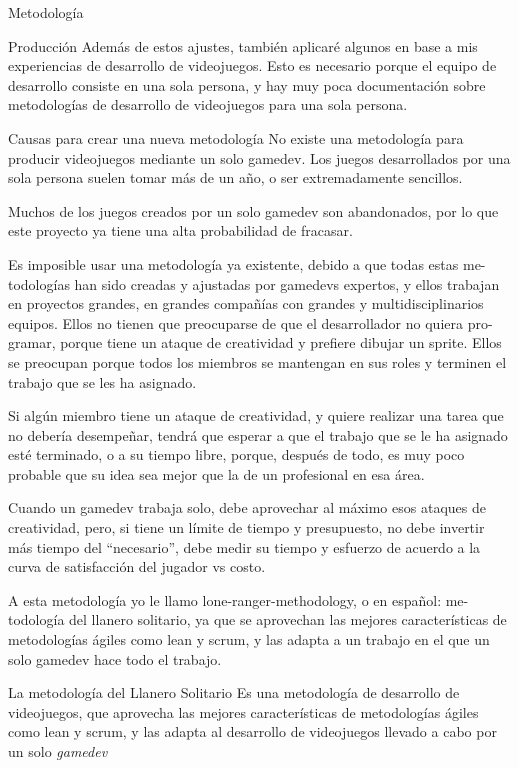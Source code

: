 \begin{section}{Metodología}
\begin{subsection}{Producción}
    Además de estos ajustes, también aplicaré algunos en base a mis experiencias de desarrollo de videojuegos. Esto es necesario porque el equipo de desarrollo consiste en una sola persona, y hay muy poca documentación sobre metodologías de desarrollo de videojuegos para una sola persona.

    \begin{subsubsection}{Causas para crear una nueva metodología}
      No existe una metodología para producir videojuegos mediante un solo gamedev. Los juegos desarrollados por una sola persona suelen tomar más de un año, o ser extremadamente sencillos.

      Muchos de los juegos creados por un solo gamedev son abandonados, por lo que este proyecto ya tiene una alta probabilidad de fracasar.

      Es imposible usar una metodología ya existente, debido a que todas estas me- todologías han sido creadas y ajustadas por gamedevs expertos, y ellos trabajan en proyectos grandes, en grandes compañías con grandes y multidisciplinarios equipos. Ellos no tienen que preocuparse de que el desarrollador no quiera pro- gramar, porque tiene un ataque de creatividad y prefiere dibujar un sprite. Ellos se preocupan porque todos los miembros se mantengan en sus roles y terminen el trabajo que se les ha asignado.

      Si algún miembro tiene un ataque de creatividad, y quiere realizar una tarea que no debería desempeñar, tendrá que esperar a que el trabajo que se le ha asignado esté terminado, o a su tiempo libre, porque, después de todo, es muy poco probable que su idea sea mejor que la de un profesional en esa área.

      Cuando un gamedev trabaja solo, debe aprovechar al máximo esos ataques de creatividad, pero, si tiene un límite de tiempo y presupuesto, no debe invertir más tiempo del ``necesario'', debe medir su tiempo y esfuerzo de acuerdo a la curva de satisfacción del jugador vs costo.

      A esta metodología yo le llamo lone-ranger-methodology, o en español: me- todología del llanero solitario, ya que se aprovechan las mejores características de metodologías ágiles como lean y scrum, y las adapta a un trabajo en el que un solo gamedev hace todo el trabajo.

    \end{subsubsection}

    \begin{subsubsection}{La metodología del Llanero Solitario}
      Es una metodología de desarrollo de videojuegos, que aprovecha las mejores características de metodologías ágiles como lean y scrum, y las adapta al desarrollo de videojuegos llevado a cabo por un solo \textit{gamedev}


\end{subsubsection}
\end{subsection}
\end{section}
